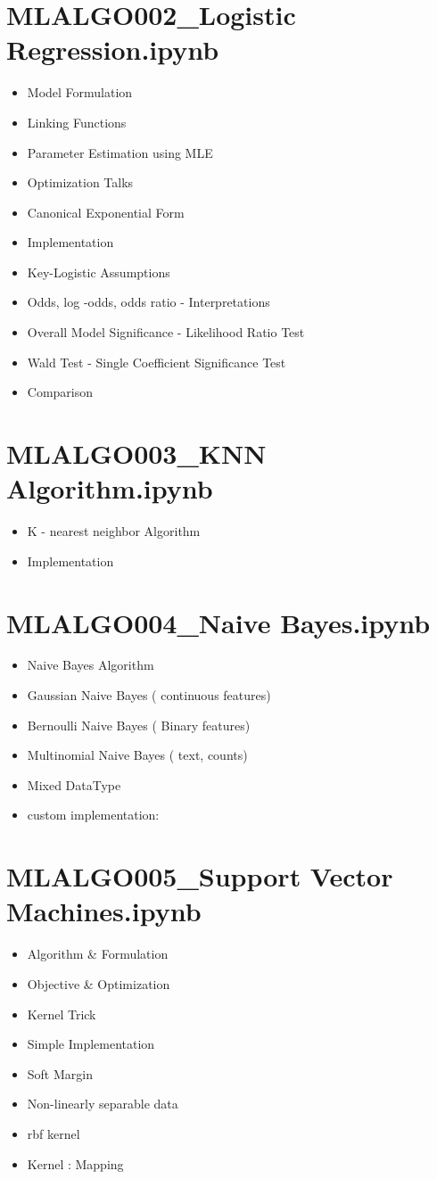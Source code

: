 \documentclass[11pt]{article}
\begin{document}
\section*{MLALGO002\_Logistic Regression.ipynb}
\begin{itemize}
\item Model Formulation
\item Linking Functions
\item Parameter Estimation using MLE
\item Optimization Talks
\item Canonical Exponential Form
\item Implementation
\item Key-Logistic Assumptions
\item Odds, log -odds, odds ratio - Interpretations
\item Overall Model Significance - Likelihood Ratio Test
\item Wald Test - Single Coefficient Significance Test
\item Comparison
\end{itemize}
\section*{MLALGO003\_KNN Algorithm.ipynb}
\begin{itemize}
\item K - nearest neighbor Algorithm
\item Implementation
\end{itemize}
\section*{MLALGO004\_Naive Bayes.ipynb}
\begin{itemize}
\item Naive Bayes Algorithm
\item Gaussian Naive Bayes ( continuous features)
\item Bernoulli Naive Bayes ( Binary features)
\item Multinomial Naive Bayes ( text, counts)
\item Mixed DataType
\item custom implementation:
\end{itemize}
\section*{MLALGO005\_Support Vector Machines.ipynb}
\begin{itemize}
\item Algorithm \& Formulation
\item Objective \& Optimization
\item Kernel Trick
\item Simple Implementation
\item Soft Margin
\item Non-linearly separable data
\item rbf kernel
\item Kernel : Mapping
\end{itemize}
\end{document}

